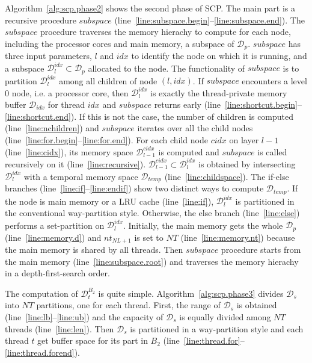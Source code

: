 Algorithm~\ref{alg:scp.phase2} shows the second phase of SCP.
The main part is a recursive procedure $subspace$
(line~\ref{line:subspace.begin}--\ref{line:subspace.end}).
The $subspace$ procedure traverses the memory hierachy
to compute for each node, including the processor cores and main memory,
a subspace of $\mathcal{D}_p$.
$subspace$ has three input parameters, $l$ and $idx$ to
identify the node on which it is running,
and a subspace $\mathcal{D}_l^{idx} \subset \mathcal{D}_p$ allocated to the node. 
The functionality of $subspace$ is to partition $\mathcal{D}_l^{idx}$
among all children of node $(l, idx)$.
If $subspace$ encounters a level 0 node, i.e. a processor core,
then $\mathcal{D}_l^{idx}$ is exactly the thread-private
memory buffer $\mathcal{D}_{idx}$ for thread $idx$ and $subspace$ returns early
(line~\ref{line:shortcut.begin}--\ref{line:shortcut.end}).
If this is not the case, the number of children is computed (line~\ref{line:nchildren})
and $subspace$ iterates over all the child nodes
(line~\ref{line:for.begin}--\ref{line:for.end}).
For each child node $cidx$ on layer $l-1$ (line~\ref{line:cidx}),
its memory space $\mathcal{D}_{l-1}^{cidx}$ is computed
and $subspace$ is called recursively on it (line~\ref{line:recursive}).
$\mathcal{D}_{l-1}^{cidx} \subset \mathcal{D}_l^{idx}$ is obtained
by intersecting $\mathcal{D}_l^{idx}$ with
a temporal memory space $\mathcal{D}_{temp}$ (line~\ref{line:childspace}).
The if-else branches (line~\ref{line:if}--\ref{line:endif})
show two distinct ways to compute $\mathcal{D}_{temp}$.
If the node is main memory or a LRU cache (line~\ref{line:if}),
$\mathcal{D}_l^{idx}$ is partitioned in the conventional
way-partition style.
Otherwise, the else branch (line~\ref{line:else}) performs
a set-partition on $\mathcal{D}_l^{idx}$.
Initially, the main memory gets the whole $\mathcal{D}_p$ (line~\ref{line:memory.d})
and $nt_{NL+1}$ is set to $NT$ (line~\ref{line:memory.nt})
because the main memory is shared by all threads.
Then $subspace$ procedure starts from the main memory (line~\ref{line:subspace.root})
and traverses the memory hierachy in a depth-first-search order.

The computation of $\mathcal{D}_t^{B_2}$ is quite simple.
Algorithm~\ref{alg:scp.phase3} divides $\mathcal{D}_s$
into $NT$ partitions, one for each thread.
First, the range of $\mathcal{D}_s$ is obtained
(line~\ref{line:lb}--\ref{line:ub}) and
the capacity of $\mathcal{D}_s$ is equally
divided among $NT$ threads (line~\ref{line:len}).
Then $\mathcal{D}_s$ is partitioned in a way-partition style
and each thread $t$ get buffer space for its part in $B_2$
(line~\ref{line:thread.for}--\ref{line:thread.forend}).

